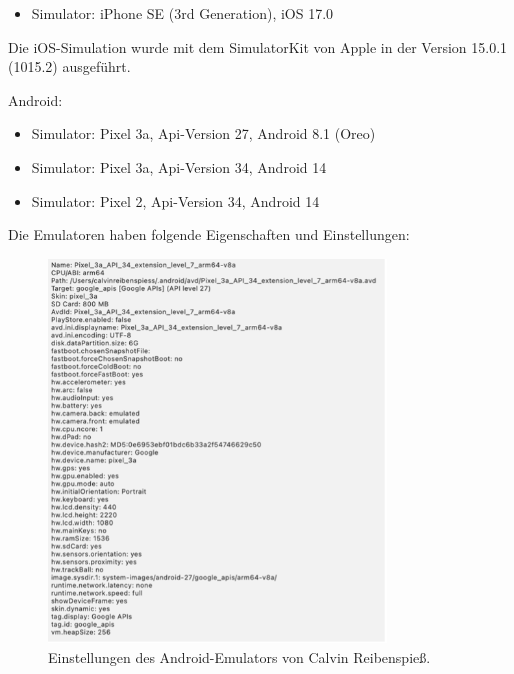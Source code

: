\begin{itemize}
  \item Simulator: iPhone SE (3rd Generation), iOS 17.0
\end{itemize}

Die iOS-Simulation wurde mit dem SimulatorKit von Apple in der Version 15.0.1 (1015.2) ausgeführt.

Android:

\begin{itemize}
  \item Simulator: Pixel 3a, Api-Version 27, Android 8.1 (Oreo)
  \item Simulator: Pixel 3a, Api-Version 34, Android 14
  \item Simulator: Pixel 2, Api-Version 34, Android 14
\end{itemize}

Die Emulatoren haben folgende Eigenschaften und Einstellungen:

\begin{figure}[H]
    \centering
    \includegraphics[width=0.8\textwidth]{images/android_emulator_reibenspiess.png}
    \caption{Einstellungen des Android-Emulators von Calvin Reibenspieß.}
    \label{branding}
\end{figure}

